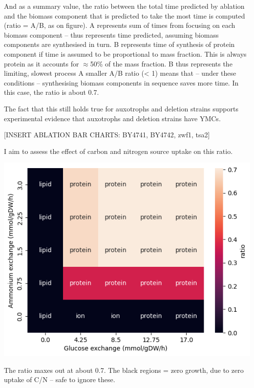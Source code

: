 And as a summary value, the ratio between the total time predicted by ablation and the biomass component that is predicted to take the most time is computed (ratio = A/B, as on figure).
A represents sum of times from focusing on each biomass component -- thus represents time predicted, assuming biomass components are synthesised in turn.
B represents time of synthesis of protein component if time is assumed to be proportional to mass fraction.
This is always protein as it accounts for $\approx$50\% of the mass fraction.
B thus represents the limiting, slowest process
A smaller A/B ratio (< 1) means that -- under these conditions -- synthesising biomass components in sequence saves more time.
In this case, the ratio is about 0.7.

The fact that this still holds true for auxotrophs and deletion strains supports experimental evidence that auxotrophs and deletion strains have YMCs.

[INSERT ABLATION BAR CHARTS: BY4741, BY4742, zwf1, tsa2]


I aim to assess the effect of carbon and nitrogen source uptake on this ratio.

\begin{center}
\includegraphics[width=.9\linewidth]{ecYeast8-ablation-heatmap.png}
\end{center}

The ratio maxes out at about 0.7.  The black regions = zero growth, due to zero uptake of C/N -- safe to ignore these.

